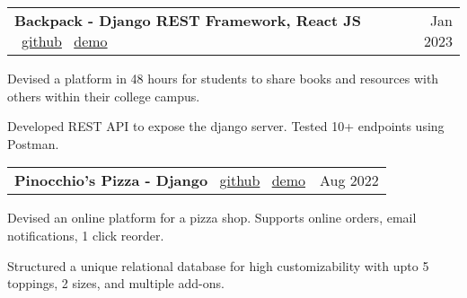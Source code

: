 \documentclass[a4paper,20pt]{article}
\makeatletter
\newcommand{\resumeSmallSubheading}[2]{
  \vspace{-1pt}\item
    \begin{tabular*}{0.97\textwidth}{l@{\extracolsep{\fill}}r}
      #1 & #2 \\
    \end{tabular*}\vspace{-8pt}
}
\makeatother
\begin{document}
    \resumeSmallSubheading{\textbf{Backpack - Django REST Framework, React JS \textbar} ~\href{https://github.com/satyamrs00/backpack/}{github} \textbar ~\href{https://main--back-backpack.netlify.app/}{demo}}{Jan 2023}
        
    \begin{description}[font=$\bullet$]
        \item {Devised a platform in 48 hours for students to share books and resources with others within their college campus.}
    \vspace{-5pt}
        \item {Developed REST API to expose the django server. Tested 10+ endpoints using Postman.}
    \end{description}

    \vspace{-5pt}

    \resumeSmallSubheading{\textbf{Pinocchio's Pizza - Django \textbar} ~\href{https://github.com/satyamrs00/pizza/}{github} \textbar ~\href{https://pizza-uyud.onrender.com/}{demo}}{Aug 2022}
    
    \begin{description}[font=$\bullet$]
        \item {Devised an online platform for a pizza shop. Supports online orders, email notifications, 1 click reorder.}
    \vspace{-5pt}
        \item {Structured a unique relational database for high customizability with upto 5 toppings, 2 sizes, and multiple add-ons.}
    \vspace{-5pt}
    \end{description}

    
\end{document}
